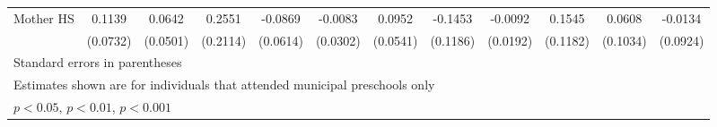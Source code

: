 \begin{table}[htbp]
\begin{tabular}{l*{11}{c}}
\addlinespace
Mother HS   &      0.1139         &      0.0642         &      0.2551         &     -0.0869         &     -0.0083         &      0.0952         &     -0.1453         &     -0.0092         &      0.1545         &      0.0608         &     -0.0134         \\
            &    (0.0732)         &    (0.0501)         &    (0.2114)         &    (0.0614)         &    (0.0302)         &    (0.0541)         &    (0.1186)         &    (0.0192)         &    (0.1182)         &    (0.1034)         &    (0.0924)         \\
\bottomrule
\multicolumn{12}{l}{\footnotesize Standard errors in parentheses}\\
\multicolumn{12}{l}{\footnotesize Estimates shown are for individuals that attended municipal preschools only}\\
\multicolumn{12}{l}{\footnotesize \sym{*} \(p<0.05\), \sym{**} \(p<0.01\), \sym{***} \(p<0.001\)}\\
\end{tabular}
\end{table}
